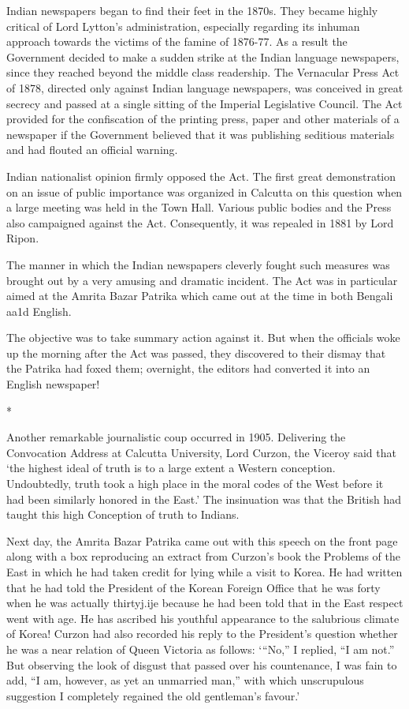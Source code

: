 Indian newspapers began to find their feet in the 1870s. They became highly critical of Lord Lytton’s administration, especially regarding its inhuman approach towards the victims of the famine of 1876-77. As a result the Government decided to make a sudden strike at the Indian language newspapers, since they reached beyond the middle class readership. The Vernacular Press Act of 1878, directed only against Indian language newspapers, was conceived in great secrecy and passed at a single sitting of the Imperial Legislative Council. The Act provided for the confiscation of the printing press, paper and other materials of a newspaper if the Government believed that it was publishing seditious materials and had flouted an official warning.

Indian nationalist opinion firmly opposed the Act. The first great demonstration on an issue of public importance was organized in Calcutta on this question when a large meeting was held in the Town Hall. Various public bodies and the Press also campaigned against the Act. Consequently, it was repealed in 1881 by Lord Ripon.

The manner in which the Indian newspapers cleverly fought such measures was brought out by a very amusing and dramatic incident. The Act was in particular aimed at the Amrita Bazar Patrika which came out at the time in both Bengali aa1d English.

The objective was to take summary action against it. But when the officials woke up the morning after the Act was passed, they discovered to their dismay that the Patrika had foxed them; overnight, the editors had converted it into an English newspaper!

\begin{center}*\end{center}



Another remarkable journalistic coup occurred in 1905. Delivering the Convocation Address at Calcutta University, Lord Curzon, the Viceroy said that ‘the highest ideal of truth is to a large extent a Western conception. Undoubtedly, truth took a high place in the moral codes of the West before it had been similarly honored in the East.’ The insinuation was that the British had taught this high Conception of truth to Indians.

Next day, the Amrita Bazar Patrika came out with this speech on the front page along with a box reproducing an extract from Curzon’s book the Problems of the East in which he had taken credit for lying while a visit to Korea. He had written that he had told the President of the Korean Foreign Office that he was forty when he was actually thirtyj.ije because he had been told that in the East respect went with age. He has ascribed his youthful appearance to the salubrious climate of Korea! Curzon had also recorded his reply to the President’s question whether he was a near relation of Queen Victoria as follows: ‘“No,” I replied, “I am not.” But observing the look of disgust that passed over his countenance, I was fain to add, “I am, however, as yet an unmarried man,” with which unscrupulous suggestion I completely regained the old gentleman’s favour.’

